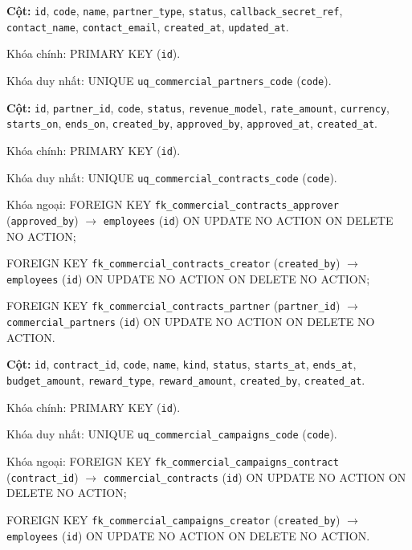\begin{description}[leftmargin=3.6cm,labelwidth=3.4cm,style=nextline]

\item[\texttt{commercial\_partners}] \textbf{Cột:} \texttt{id}, \texttt{code}, \texttt{name}, \texttt{partner\_type}, \texttt{status}, \texttt{callback\_secret\_ref}, \texttt{contact\_name}, \texttt{contact\_email}, \texttt{created\_at}, \texttt{updated\_at}.

Khóa chính: PRIMARY KEY (\texttt{id}).

Khóa duy nhất: UNIQUE \texttt{uq\_commercial\_partners\_code} (\texttt{code}).

\item[\texttt{commercial\_contracts}] \textbf{Cột:} \texttt{id}, \texttt{partner\_id}, \texttt{code}, \texttt{status}, \texttt{revenue\_model}, \texttt{rate\_amount}, \texttt{currency}, \texttt{starts\_on}, \texttt{ends\_on}, \texttt{created\_by}, \texttt{approved\_by}, \texttt{approved\_at}, \texttt{created\_at}.

Khóa chính: PRIMARY KEY (\texttt{id}).

Khóa duy nhất: UNIQUE \texttt{uq\_commercial\_contracts\_code} (\texttt{code}).

Khóa ngoại: FOREIGN KEY \texttt{fk\_commercial\_contracts\_approver} (\texttt{approved\_by}) $\rightarrow$ \texttt{employees} (\texttt{id}) ON UPDATE NO ACTION ON DELETE NO ACTION;\par FOREIGN KEY \texttt{fk\_commercial\_contracts\_creator} (\texttt{created\_by}) $\rightarrow$ \texttt{employees} (\texttt{id}) ON UPDATE NO ACTION ON DELETE NO ACTION;\par FOREIGN KEY \texttt{fk\_commercial\_contracts\_partner} (\texttt{partner\_id}) $\rightarrow$ \texttt{commercial\_partners} (\texttt{id}) ON UPDATE NO ACTION ON DELETE NO ACTION.

\item[\texttt{commercial\_campaigns}] \textbf{Cột:} \texttt{id}, \texttt{contract\_id}, \texttt{code}, \texttt{name}, \texttt{kind}, \texttt{status}, \texttt{starts\_at}, \texttt{ends\_at}, \texttt{budget\_amount}, \texttt{reward\_type}, \texttt{reward\_amount}, \texttt{created\_by}, \texttt{created\_at}.

Khóa chính: PRIMARY KEY (\texttt{id}).

Khóa duy nhất: UNIQUE \texttt{uq\_commercial\_campaigns\_code} (\texttt{code}).

Khóa ngoại: FOREIGN KEY \texttt{fk\_commercial\_campaigns\_contract} (\texttt{contract\_id}) $\rightarrow$ \texttt{commercial\_contracts} (\texttt{id}) ON UPDATE NO ACTION ON DELETE NO ACTION;\par FOREIGN KEY \texttt{fk\_commercial\_campaigns\_creator} (\texttt{created\_by}) $\rightarrow$ \texttt{employees} (\texttt{id}) ON UPDATE NO ACTION ON DELETE NO ACTION.


\end{description}
